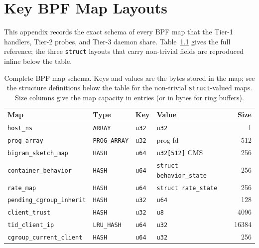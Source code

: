\chapter{Key BPF Map Layouts}
\label{AppendixB}

This appendix records the exact schema of every BPF map that the Tier-1
handlers, Tier-2 probes, and Tier-3 daemon share. Table~\ref{tab:bpf-maps-full}
gives the full reference; the three \texttt{struct} layouts that carry
non-trivial fields are reproduced inline below the table.

\begin{table}[h]
\centering
\caption[Full BPF map schema]{Complete BPF map schema. Keys and values
are the bytes stored in the map; see the structure definitions below
the table for the non-trivial \texttt{struct}-valued maps. Size columns
give the map capacity in entries (or in bytes for ring buffers).}
\label{tab:bpf-maps-full}
\footnotesize
\setlength\tabcolsep{3pt}
\begin{tabular}{@{}l l l l r@{}}
\toprule
Map                          & Type                 & Key      & Value                          & Size \\
\midrule
\texttt{host\_ns}            & \texttt{ARRAY}       & \texttt{u32}  & \texttt{u32}                       & 1 \\
\texttt{prog\_array}         & \texttt{PROG\_ARRAY} & \texttt{u32}  & prog fd                            & 512 \\
\texttt{bigram\_sketch\_map} & \texttt{HASH}        & \texttt{u64}  & \texttt{u32[512]} CMS             & 256 \\
\texttt{container\_behavior} & \texttt{HASH}        & \texttt{u64}  & \texttt{struct behavior\_state}   & 256 \\
\texttt{rate\_map}           & \texttt{HASH}        & \texttt{u64}  & \texttt{struct rate\_state}       & 256 \\
\texttt{pending\_cgroup\_inherit} & \texttt{HASH}   & \texttt{u32}  & \texttt{u64}                      & 128 \\
\texttt{client\_trust}       & \texttt{HASH}        & \texttt{u32}  & \texttt{u8}                       & 4096 \\
\texttt{tid\_client\_ip}     & \texttt{LRU\_HASH}   & \texttt{u64}  & \texttt{u32}                      & 16384 \\
\texttt{cgroup\_current\_client} & \texttt{HASH}    & \texttt{u64}  & \texttt{u32}                      & 256 \\

\end{tabular}
\end{table}

